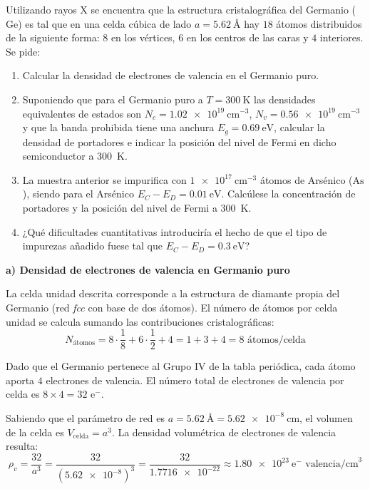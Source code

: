 \newpage
\begin{problema}
Utilizando rayos X se encuentra que la estructura cristalográfica del Germanio ($\text{Ge}$) es tal que en una celda cúbica de lado $a = \SI{5.62}{\text{\AA}}$ hay $18$ átomos distribuidos de la siguiente forma: $8$ en los vértices, $6$ en los centros de las caras y $4$ interiores. Se pide:
\begin{enumerate}[label=\alph*)]
    \item Calcular la densidad de electrones de valencia en el Germanio puro.
    \item Suponiendo que para el Germanio puro a $T = \SI{300}{\kelvin}$ las densidades equivalentes de estados son $N_c = \SI{1.02e19}{\cm^{-3}}$, $N_v = \SI{0.56e19}{\cm^{-3}}$ y que la banda prohibida tiene una anchura $E_g = \SI{0.69}{\eV}$, calcular la densidad de portadores e indicar la posición del nivel de Fermi en dicho semiconductor a \SI{300}{\kelvin}.
    \item La muestra anterior se impurifica con $\SI{1e17}{\cm^{-3}}$ átomos de Arsénico ($\text{As}$), siendo para el Arsénico $E_C - E_D = \SI{0.01}{\eV}$. Calcúlese la concentración de portadores y la posición del nivel de Fermi a \SI{300}{\kelvin}.
    \item ¿Qué dificultades cuantitativas introduciría el hecho de que el tipo de impurezas añadido fuese tal que $E_C - E_D = \SI{0.3}{\eV}$?
\end{enumerate}

\tcblower

\textbf{a) Densidad de electrones de valencia en Germanio puro}

La celda unidad descrita corresponde a la estructura de diamante propia del Germanio (red \textit{fcc} con base de dos átomos). El número de átomos por celda unidad se calcula sumando las contribuciones cristalográficas:
\[
N_{\text{átomos}} = 8 \cdot \frac{1}{8} + 6 \cdot \frac{1}{2} + 4 = 1 + 3 + 4 = 8 \text{ átomos/celda}
\]

Dado que el Germanio pertenece al Grupo IV de la tabla periódica, cada átomo aporta $4$ electrones de valencia. El número total de electrones de valencia por celda es $8 \times 4 = 32 \text{ e}^-$.

Sabiendo que el parámetro de red es $a = \SI{5.62}{\text{\AA}} = \SI{5.62e-8}{\cm}$, el volumen de la celda es $V_{\text{celda}} = a^3$. La densidad volumétrica de electrones de valencia resulta:
\[
\rho_v = \frac{32}{a^3} = \frac{32}{(\num{5.62e-8})^3} = \frac{32}{\num{1.7716e-22}} \approx \SI{1.80e23}{\text{e}^-\text{ valencia/cm}^3}
\]


\end{problema}
